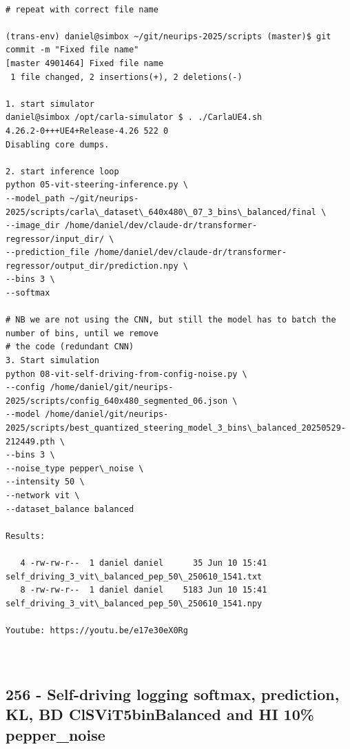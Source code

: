 \begin{verbatim}

# repeat with correct file name

(trans-env) daniel@simbox ~/git/neurips-2025/scripts (master)$ git commit -m "Fixed file name"
[master 4901464] Fixed file name
 1 file changed, 2 insertions(+), 2 deletions(-)
 
1. start simulator
daniel@simbox /opt/carla-simulator $ . ./CarlaUE4.sh 
4.26.2-0+++UE4+Release-4.26 522 0
Disabling core dumps.

2. start inference loop
python 05-vit-steering-inference.py \
--model_path ~/git/neurips-2025/scripts/carla\_dataset\_640x480\_07_3_bins\_balanced/final \
--image_dir /home/daniel/dev/claude-dr/transformer-regressor/input_dir/ \
--prediction_file /home/daniel/dev/claude-dr/transformer-regressor/output_dir/prediction.npy \
--bins 3 \
--softmax

# NB we are not using the CNN, but still the model has to batch the number of bins, until we remove
# the code (redundant CNN)
3. Start simulation
python 08-vit-self-driving-from-config-noise.py \
--config /home/daniel/git/neurips-2025/scripts/config_640x480_segmented_06.json \
--model /home/daniel/git/neurips-2025/scripts/best_quantized_steering_model_3_bins\_balanced_20250529-212449.pth \
--bins 3 \
--noise_type pepper\_noise \
--intensity 50 \
--network vit \
--dataset_balance balanced

Results:

   4 -rw-rw-r--  1 daniel daniel      35 Jun 10 15:41 self_driving_3_vit\_balanced_pep_50\_250610_1541.txt
   8 -rw-rw-r--  1 daniel daniel    5183 Jun 10 15:41 self_driving_3_vit\_balanced_pep_50\_250610_1541.npy

Youtube: https://youtu.be/e17e30eX0Rg



\end{verbatim}

\subsection{256 - Self-driving logging softmax, prediction, KL, BD ClSViT5binBalanced and HI 10\% pepper\_noise}
\label{app_res:256}

